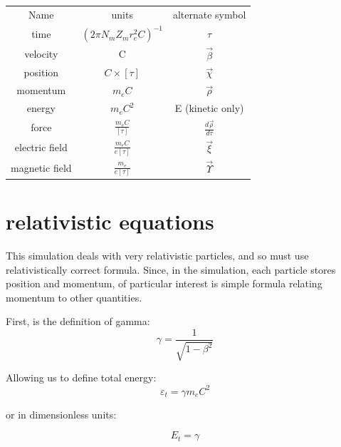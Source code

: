 \documentclass[]{article}
\begin{document}
\begin{center}
	\begin{tabular}{ c c c }
		Name                 & units                             &   alternate symbol  \\ 
		time                 & $(2\pi N_m Z_m r^2_e C)^{-1}$     & $ \tau$    \\  
		velocity             & C                                 &  $\vec{\beta}$       \\  
		position             & $C\times \left[ \tau \right] $    & $ \vec{\chi} $     \\
		momentum             & $m_e C $                          &  $\vec{\rho} $     \\
		energy               & $m_e C^2 $                        &  E (kinetic only)      \\
		force                & $\frac{m_e C}{ \left[ \tau \right]} $     & $ \frac{d\vec{\rho}}{d\tau}$       \\
		electric field       & $\frac{m_e C}{ e \left[ \tau \right]} $   & $  \vec{\xi}  $   \\
		magnetic field       & $\frac{m_e }{ e \left[ \tau \right]} $    &  $ \vec{\Upsilon} $     \\
	\end{tabular}
\end{center}

\section{relativistic equations}

This simulation deals with very relativistic particles, and so must use relativistically correct formula. Since, in the simulation, each particle stores position and momentum, of particular interest is simple formula relating momentum to other quantities.

First, is the definition of gamma:
\begin{equation}
\gamma = \frac{1}{ \sqrt{1-\beta^2 } }
\end{equation}

Allowing us to define total energy:
\begin{equation}
\varepsilon_t = \gamma m_e C^2
\end{equation}

or in dimensionless units:

\begin{equation}
E_t = \gamma 
\end{equation}
\end{document}
